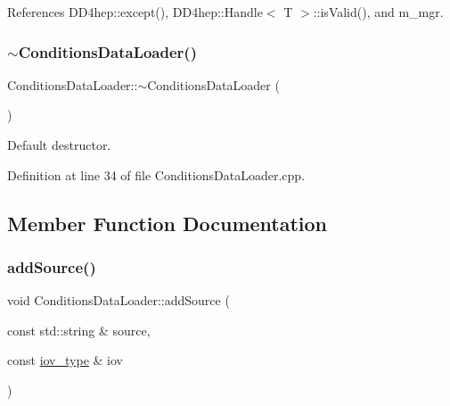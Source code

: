 References D\+D4hep\+::except(), D\+D4hep\+::\+Handle$<$ T $>$\+::is\+Valid(), and m\+\_\+mgr.

\hypertarget{class_d_d4hep_1_1_conditions_1_1_conditions_data_loader_a5918a0778c3e0f0f80a441a5f3b88770}{}\label{class_d_d4hep_1_1_conditions_1_1_conditions_data_loader_a5918a0778c3e0f0f80a441a5f3b88770} 
\subsubsection{\texorpdfstring{$\sim$\+Conditions\+Data\+Loader()}{~ConditionsDataLoader()}}
{\footnotesize\ttfamily Conditions\+Data\+Loader\+::$\sim$\+Conditions\+Data\+Loader (\begin{DoxyParamCaption}{ }\end{DoxyParamCaption})\hspace{0.3cm}{\ttfamily [virtual]}}



Default destructor. 



Definition at line 34 of file Conditions\+Data\+Loader.\+cpp.



\subsection{Member Function Documentation}
\hypertarget{class_d_d4hep_1_1_conditions_1_1_conditions_data_loader_a5f4cea772ab0ac281d16f2eb0a52c4c4}{}\label{class_d_d4hep_1_1_conditions_1_1_conditions_data_loader_a5f4cea772ab0ac281d16f2eb0a52c4c4} 
\subsubsection{\texorpdfstring{add\+Source()}{addSource()}}
{\footnotesize\ttfamily void Conditions\+Data\+Loader\+::add\+Source (\begin{DoxyParamCaption}\item[{const std\+::string \&}]{source,  }\item[{const \hyperlink{class_d_d4hep_1_1_conditions_1_1_conditions_data_loader_a510aa9a02f5e798d8d96c9e3cb5a36af}{iov\+\_\+type} \&}]{iov }\end{DoxyParamCaption})}



